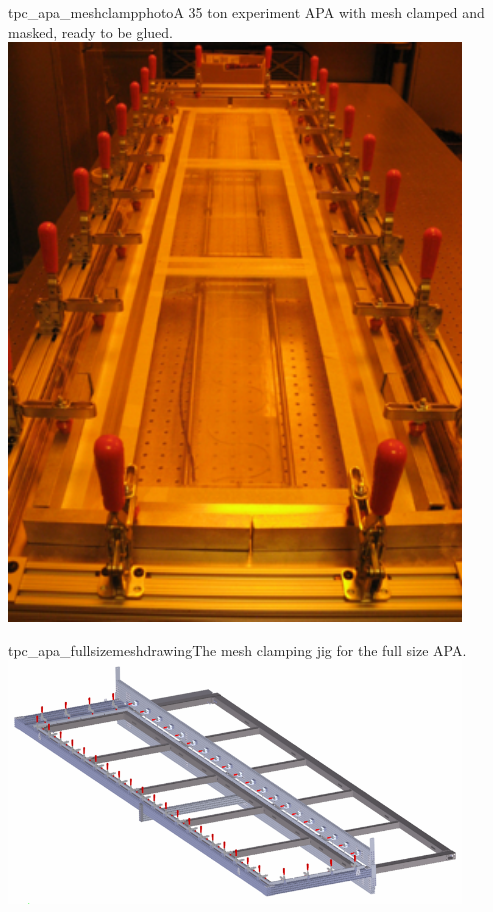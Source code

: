 \begin{cdrfigure}{tpc_apa_meshclampphoto}{A 35 ton experiment APA with mesh clamped and masked, ready to be glued.}
\includegraphics[width=0.9\textwidth]{figures/tpc_apa_meshclampsphoto.png} 
\end{cdrfigure}

\begin{cdrfigure}{tpc_apa_fullsizemeshdrawing}{The mesh clamping jig for the full size APA.}
\includegraphics[width=0.9\textwidth]{figures/tpc_apa_fullsizemeshdrawing.png} 
\end{cdrfigure}

